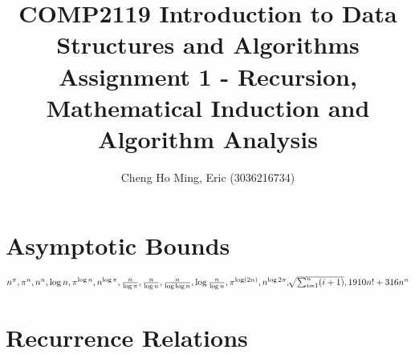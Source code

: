 \documentclass{article}
\title{COMP2119 Introduction to Data Structures and Algorithms
Assignment 1 - Recursion, Mathematical Induction and Algorithm Analysis}
\author{Cheng Ho Ming, Eric (3036216734)}
\begin{document}
\maketitle

\section{Asymptotic Bounds}

$n^\pi, \pi^n, n^n,{\log n}, \pi ^ {\log n}, n^{\log \pi}, \frac{n}{\log\pi}, \frac{n}{\log n}, \frac{n}{\log {\log n}}, {\log {\frac{n}{\log n}}},\\
\pi ^ {\log (2n)}, n^{\log{2\pi}}, \sqrt[]{\sum_{i=1}^{n} (i+1)}, 1910n! + 316n^n$

\section{Recurrence Relations}
\end{document}

